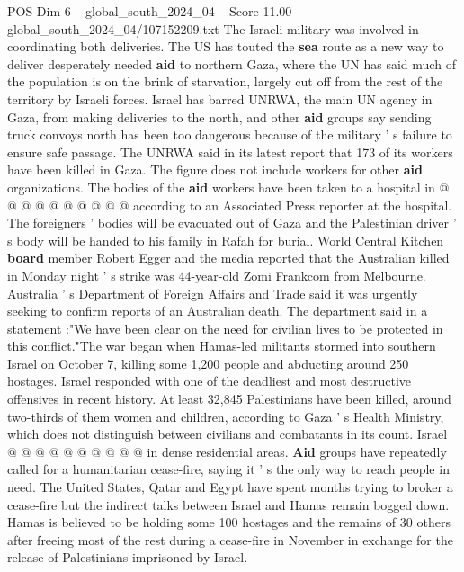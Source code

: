 \begin{textsample}{POS Dim 6 – global\_south\_2024\_04 – Score 11.00 – global\_south\_2024\_04/107152209.txt}
The Israeli military was involved in coordinating both deliveries.
The US has touted the \textbf{sea} route as a new way to deliver desperately needed \textbf{aid} to northern Gaza, where the UN has said much of the population is on the brink of starvation, largely cut off from the rest of the territory by Israeli forces.
Israel has barred UNRWA, the main UN agency in Gaza, from making deliveries to the north, and other \textbf{aid} groups say sending truck convoys north has been too dangerous because of the military ' s failure to ensure safe passage.
The UNRWA said in its latest report that 173 of its workers have been killed in Gaza.
The figure does not include workers for other \textbf{aid} organizations.
The bodies of the \textbf{aid} workers have been taken to a hospital in @ @ @ @ @ @ @ @ @ @ according to an Associated Press reporter at the hospital.
The foreigners ' bodies will be evacuated out of Gaza and the Palestinian driver ' s body will be handed to his family in Rafah for burial.
World Central Kitchen \textbf{board} member Robert Egger and the media reported that the Australian killed in Monday night ' s strike was 44-year-old Zomi Frankcom from Melbourne.
Australia ' s Department of Foreign Affairs and Trade said it was urgently seeking to confirm reports of an Australian death.
The department said in a statement :"We have been clear on the need for civilian lives to be protected in this conflict."The war began when Hamas-led militants stormed into southern Israel on October 7, killing some 1,200 people and abducting around 250 hostages.
Israel responded with one of the deadliest and most destructive offensives in recent history.
At least 32,845 Palestinians have been killed, around two-thirds of them women and children, according to Gaza ' s Health Ministry, which does not distinguish between civilians and combatants in its count.
Israel @ @ @ @ @ @ @ @ @ @ in dense residential areas. \textbf{Aid} groups have repeatedly called for a humanitarian cease-fire, saying it ' s the only way to reach people in need.
The United States, Qatar and Egypt have spent months trying to broker a cease-fire but the indirect talks between Israel and Hamas remain bogged down.
Hamas is believed to be holding some 100 hostages and the remains of 30 others after freeing most of the rest during a cease-fire in November in exchange for the release of Palestinians imprisoned by Israel.

\end{textsample}
